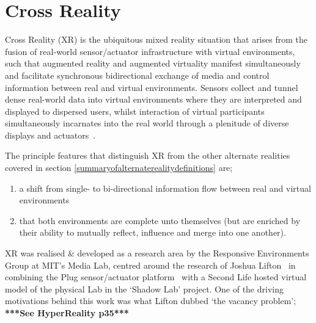 
%


\section{Cross Reality}
\label{sec_crossreality}

Cross Reality (XR) is the ubiquitous mixed reality situation that arises from the fusion of real-world sensor/actuator infrastructure with virtual environments, such that augmented reality and augmented virtuality manifest simultaneously and facilitate synchronous bidirectional exchange of media and control information between real and virtual environments. Sensors collect and tunnel dense real-world data into virtual environments where they are interpreted and displayed to dispersed users, whilst interaction of virtual participants simultaneously incarnates into the real world through a plenitude of diverse displays and actuators~\cite{Paradiso2009}.

The principle features that distinguish XR from the other alternate realities covered in section \ref{summaryofalternaterealitydefinitions} are;
\begin{enumerate}
	\item a shift from single- to bi-directional information flow between real and virtual environments~\cite{kim:practical}
	\item that both environments are complete unto themselves (but are enriched by their ability to mutually reflect, influence and merge into one another).~\cite{lifton:merging}
\end{enumerate}


XR was realised \& developed as a research area by the Responsive Environments Group at MIT's Media Lab, centred around the research of Joshua Lifton~\cite{Lifton2007a} in combining the Plug sensor/actuator platform~\cite{Lifton2007b} with a Second Life hosted virtual model of the physical Lab in the `Shadow Lab' project. One of the driving motivations behind this work was what Lifton dubbed `the vacancy problem'; \textbf{***See HyperReality p35***}


